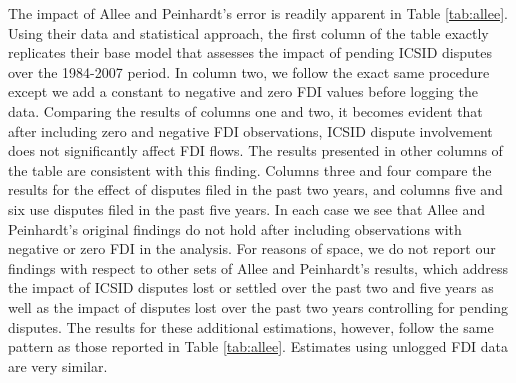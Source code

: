 \documentclass[12pt,onesided]{amsart}
\begin{document}
The impact of Allee and Peinhardt's error is readily apparent in Table \ref{tab:allee}. Using their data and statistical approach, the first column of the table exactly replicates their base model that assesses the impact of pending ICSID disputes over the 1984-2007 period. In column two, we follow the exact same procedure except we add a constant to negative and zero FDI values before logging the data. Comparing the results of columns one and two, it becomes evident that after including zero and negative FDI observations, ICSID dispute involvement does not significantly affect FDI flows. The results presented in other columns of the table are consistent with this finding. Columns three and four compare the results for the effect of disputes filed in the past two years, and columns five and six use disputes filed in the past five years. In each case we see that Allee and Peinhardt's original findings do not hold after including observations with negative or zero FDI in the analysis. For reasons of space, we do not report our findings with respect to other sets of Allee and Peinhardt's results, which address the impact of ICSID disputes lost or settled over the past two and five years as well as the impact of disputes lost over the past two years controlling for pending disputes. The results for these additional estimations, however, follow the same pattern as those reported in Table \ref{tab:allee}. Estimates using unlogged FDI data are very similar. 

\end{document}
